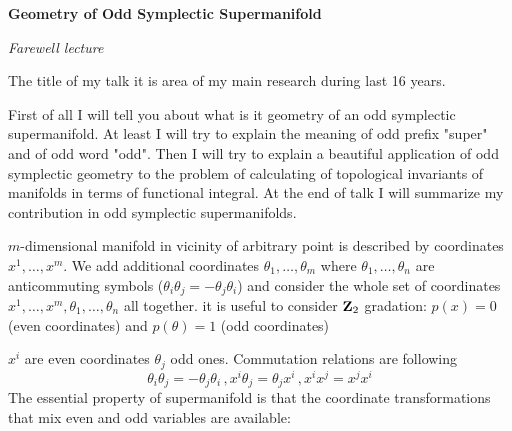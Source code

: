  $$ $$
     \centerline{\bf Geometry of Odd Symplectic Supermanifold}
       \medskip
       \centerline {\it Farewell lecture}

       \bigskip
The title of my talk it is area of my main research during last
16 years.

 First of all I will tell you about what is it geometry
 of an odd symplectic supermanifold. At least I will try to explain the meaning of
 odd prefix "super" and of odd word "odd".
 Then I will try to explain a beautiful application of odd symplectic geometry
 to the problem of calculating of topological invariants of manifolds
  in terms of functional integral. At the end of talk I will summarize
  my contribution in odd symplectic supermanifolds.

  $m$-dimensional manifold in vicinity of arbitrary point is described by coordinates
  ${x^1,\dots,x^m}$. We add additional coordinates ${\theta_1,\dots,\theta_m}$
  where ${\theta_1,\dots,\theta_n}$ are anticommuting symbols
  ($\theta_i\theta_j=-\theta_j\theta_i$) and consider the whole set
  of coordinates $x^1,\dots,x^m,\theta_1,\dots,\theta_n$ all together.
  it is useful to consider ${\bf Z}_2$ gradation:
  $p(x)=0$ (even coordinates) and $p(\theta)=1$ (odd coordinates)

  $x^i$ are even coordinates $\theta_j$ odd ones.
  Commutation relations are following
                          $$
                          \theta_i\theta_j=-\theta_j\theta_i\,,
                          x^i\theta_j=\theta_j x^i\,,
                          x^i x^j=x^j x^i
                             $$
 The essential property of supermanifold is that the coordinate
  transformations that mix even and odd variables are available:


  \bye
